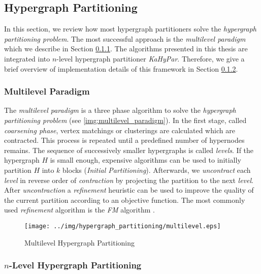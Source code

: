 
\subsection{Hypergraph Partitioning}

In this section, we review how most hypergraph partitioners solve the \emph{hypergraph
partitioning problem}. The most successful
approach is the \emph{multilevel paradigm} \cite{alpert1995recent,bader2013graph,
papa2007hypergraph} which we describe in Section \ref{sec:multilevel_paradigm}.
The algorithms presented in this thesis are integrated into $n$-level hypergraph partitioner \emph{KaHyPar}. Therefore, we
give a brief overview of implementation details of this framework in Section \ref{sec:kahypar}.

\subsubsection{Multilevel Paradigm}
\label{sec:multilevel_paradigm}

The \emph{multilevel paradigm} is a three phase algorithm to solve the \emph{hypergraph 
partitioning problem} (see \autoref{img:multilevel_paradigm}). In the first stage, called
\emph{coarsening phase}, vertex matchings or clusterings are calculated which are contracted. This process is
repeated until a predefined number of hypernodes remains. The sequence of successively
smaller hypergraphs is called \emph{levels}. If the hypergraph $H$ is small enough, expensive 
algorithms can be used to initially partition $H$ into $k$ blocks (\emph{Initial Partitioning}). Afterwards, we
\emph{uncontract} each \emph{level} in reverse order of \emph{contraction} by projecting
the partition to the next \emph{level}. After \emph{uncontraction} a \emph{refinement} heuristic can be
used to improve the quality of the current partition according
to an objective function. The most commonly used \emph{refinement} algorithm is the \emph{FM}
algorithm \cite{fiduccia1988linear}.

\begin{figure}
\centering
\texttt{[image: ../img/hypergraph\_partitioning/multilevel.eps]}
\caption{Multilevel Hypergraph Partitioning}
\label{img:multilevel_paradigm}
\end{figure}


\subsubsection{$n$-Level Hypergraph Partitioning}
\label{sec:kahypar}

